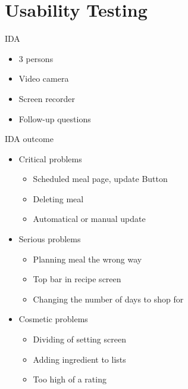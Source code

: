 \section{Usability Testing} 
\begin{frame}{IDA}
	\begin{itemize}
		\item 3 persons
		\item Video camera
		\item Screen recorder
		\item Follow-up questions
	\end{itemize}
\end{frame}

\begin{frame}{IDA outcome}
    \begin{itemize}
	\item Critical problems
		\begin{itemize}
			\item Scheduled meal page, update Button
			\item Deleting meal
			\item Automatical or manual update
		\end{itemize}
	\item Serious problems
		\begin{itemize}
			\item Planning meal the wrong way
			\item Top bar in recipe screen
			\item Changing the number of days to shop for 
		\end{itemize}
	\item Cosmetic problems
		\begin{itemize}
			\item Dividing of setting screen
			\item Adding ingredient to lists
			\item Too high of a rating
		\end{itemize}
    \end{itemize}
\end{frame}